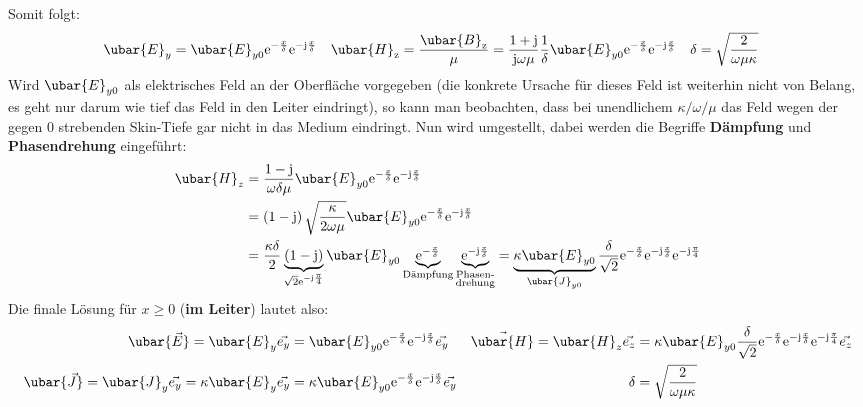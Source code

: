 			  Somit folgt:
			        \begin{align}
				        \ubar{E}_{y} & = \ubar{E}_{y0}  \mathrm{e}^{-\frac{x}{\delta}}  \mathrm{e}^{-\mathrm{j}\frac{x}{\delta}} & \ubar{H}_\mathrm{z} & = \dfrac{\ubar{B}_\mathrm{z}}{\mu} = \dfrac{1 + \mathrm{j}}{\mathrm{j}\omega\mu} \dfrac{1}{\delta} \ubar{E}_{y0}  \mathrm{e}^{-\frac{x}{\delta}}  \mathrm{e}^{-\mathrm{j}\frac{x}{\delta}} & \delta & = \sqrt{\dfrac{2}{\omega \mu \kappa}}
			        \end{align}
			        Wird $\ubar{E}_{y0}$ als elektrisches Feld an der Oberfläche vorgegeben (die konkrete Ursache für dieses Feld ist weiterhin nicht von Belang, es geht nur darum wie tief das Feld in den Leiter eindringt), so kann man beobachten, dass bei unendlichem $\kappa/\omega/\mu$ das Feld wegen der gegen 0 strebenden Skin-Tiefe gar nicht in das Medium eindringt. Nun wird umgestellt, dabei werden die Begriffe \textbf{Dämpfung} und \textbf{Phasendrehung} eingeführt:
			        \begin{equation}\begin{split}
					        \ubar{H}_z &= \dfrac{1 - \mathrm{j}}{\omega \delta \mu} \ubar{E}_{y0}  \mathrm{e}^{-\frac{x}{\delta}}  \mathrm{e}^{-\mathrm{j}\frac{x}{\delta}} \\
					        &= \left(1 - \mathrm{j}\right) \sqrt{\dfrac{\kappa}{2 \omega \mu}}  \ubar{E}_{y0}  \mathrm{e}^{-\frac{x}{\delta}}  \mathrm{e}^{-\mathrm{j}\frac{x}{\delta}} \\
					        &= \dfrac{\kappa \delta}{2} \underbrace{\left( 1 - \mathrm{j}\right)}_{\sqrt{2} \mathrm{e}^{-\mathrm{j}\frac{\pi}{4}}} \ubar{E}_{y0} \underbrace{ \mathrm{e}^{-\frac{x}{\delta}}}_{\text{Dämpfung}} \underbrace{ \mathrm{e}^{-\mathrm{j}\frac{x}{\delta}}}_{\substack{\text{Phasen-}\\ \text{drehung}}} = \underbrace{\kappa \ubar{E}_{y0}}_{\ubar{J}_{y0}}\dfrac{\delta}{\sqrt{2}}  \mathrm{e}^{-\frac{x}{\delta}}  \mathrm{e}^{-\mathrm{j}\frac{x}{\delta}} \mathrm{e}^{-\mathrm{j}\frac{\pi}{4}}
				        \end{split}\end{equation}
			        Die finale Lösung für $x\ge 0$ (\textbf{im Leiter}) lautet also:
			        \begin{align}\label{finalskin}
			        	\ubar{\vec{E}} = \ubar{E}_{y}\vec{e_y}                             & = \ubar{E}_{y0}  \mathrm{e}^{-\frac{x}{\delta}}  \mathrm{e}^{-\mathrm{j}\frac{x}{\delta}}\vec{e_y}        & \vec{\ubar{H}} =\ubar{H}_{z}\vec{e_z} & = \kappa \ubar{E}_{y0}\dfrac{\delta}{\sqrt{2}}  \mathrm{e}^{-\frac{x}{\delta}}  \mathrm{e}^{-\mathrm{j}\frac{x}{\delta}} \mathrm{e}^{-\mathrm{j}\frac{\pi}{4}}\vec{e_z} \\
			        	\ubar{\vec{J}} = \ubar{J}_{y}\vec{e_y}=\kappa\ubar{E}_{y}\vec{e_y} & = \kappa \ubar{E}_{y0}  \mathrm{e}^{-\frac{x}{\delta}}  \mathrm{e}^{-\mathrm{j}\frac{x}{\delta}}\vec{e_y} & \delta                                & = \sqrt{\dfrac{2}{\omega \mu \kappa}}\nonumber
			        \end{align}
